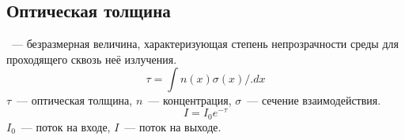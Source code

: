 \subsection{Оптическая толщина}
~--- безразмерная величина, характеризующая степень непрозрачности среды для проходящего сквозь неё излучения.
\begin{equation}
\tau = \int n(x) \sigma(x)/.dx
\end{equation}
$\tau$~--- оптическая толщина, $n$~--- концентрация, $\sigma$~--- сечение взаимодействия.
\begin{equation}
I = I_0 e^{-\tau}
\end{equation}
$I_0$~--- поток на входе, $I$~--- поток на выходе.